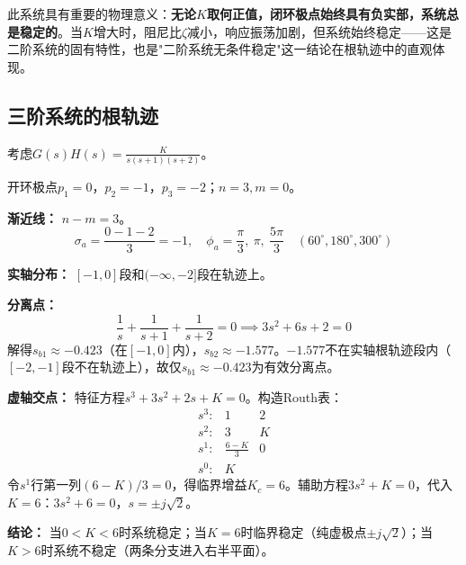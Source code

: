 此系统具有重要的物理意义：\textbf{无论$K$取何正值，闭环极点始终具有负实部，系统总是稳定的}。当$K$增大时，阻尼比$\zeta$减小，响应振荡加剧，但系统始终稳定——这是二阶系统的固有特性，也是"二阶系统无条件稳定"这一结论在根轨迹中的直观体现。

\subsection{三阶系统的根轨迹}

考虑$G(s)H(s) = \frac{K}{s(s+1)(s+2)}$。

开环极点$p_1=0$，$p_2=-1$，$p_3=-2$；$n=3, m=0$。

\textbf{渐近线：} $n-m=3$。
\[
\sigma_a = \frac{0-1-2}{3} = -1, \quad
\phi_a = \frac{\pi}{3},\ \pi,\ \frac{5\pi}{3} \quad (60^\circ, 180^\circ, 300^\circ)
\]

\textbf{实轴分布：} $[-1,0]$段和$(-\infty,-2]$段在轨迹上。

\textbf{分离点：}
\[
\frac{1}{s} + \frac{1}{s+1} + \frac{1}{s+2} = 0 \implies 3s^2 + 6s + 2 = 0
\]
解得$s_{b1} \approx -0.423$（在$[-1,0]$内），$s_{b2} \approx -1.577$。$-1.577$不在实轴根轨迹段内（$[-2,-1]$段不在轨迹上），故仅$s_{b1} \approx -0.423$为有效分离点。

\textbf{虚轴交点：} 特征方程$s^3+3s^2+2s+K=0$。构造Routh表：
\[
\begin{array}{c|cc}
s^3: & 1 & 2 \\
s^2: & 3 & K \\
s^1: & \frac{6-K}{3} & 0 \\
s^0: & K &
\end{array}
\]
令$s^1$行第一列$(6-K)/3 = 0$，得临界增益$K_c = 6$。辅助方程$3s^2+K=0$，代入$K=6$：$3s^2+6=0$，$s = \pm j\sqrt{2}$。

\textbf{结论：} 当$0 < K < 6$时系统稳定；当$K=6$时临界稳定（纯虚极点$\pm j\sqrt{2}$）；当$K>6$时系统不稳定（两条分支进入右半平面）。

